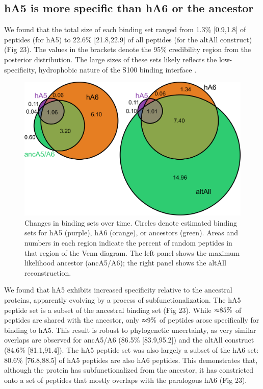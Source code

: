 \subsection{hA5 is more specific than hA6 or the ancestor}

We found that the total size of each binding set ranged from 1.3\%
{[}0.9,1.8{]} of peptides (for hA5) to 22.6\% {[}21.8,22.9{]} of all
peptides (for the altAll construct) (Fig 23). The values in the brackets
denote the 95\% credibility region from the posterior distribution.
The large sizes of these sets likely reflects the low-specificity,
hydrophobic nature of the S100 binding interface \citep{wheeler_conservation_2017}. 

\begin{figure}%
\centering
	\includegraphics{ch6-fig5.png} 
\caption[Changes in binding sets over time]{Changes in binding sets over time. Circles denote
estimated binding sets for hA5 (purple), hA6 (orange), or ancestors
(green). Areas and numbers in each region indicate the percent of
random peptides in that region of the Venn diagram. The left panel
shows the maximum likelihood ancestor (ancA5/A6); the right panel
shows the altAll reconstruction.\label{samplefigure}}	
\end{figure}

We found that hA5 exhibits increased specificity relative to the ancestral
proteins, apparently evolving by a process of subfunctionalization.
The hA5 peptide set is a subset of the ancestral binding set (Fig
23). While $\text{\ensuremath{\approx}}85\%$ of peptides are shared
with the ancestor, only $\text{\ensuremath{\approx}}9\%$ of peptides
arose specifically for binding to hA5. This result is robust to phylogenetic
uncertainty, as very similar overlaps are observed for ancA5/A6 (86.5\%
{[}83.9,95.2{]}) and the altAll construct (84.6\% {[}81.1,91.4{]}).
The hA5 peptide set was also largely a subset of the hA6 set: 80.6\%
{[}76.8,88.5{]} of hA5 peptides are also hA6 peptides. This demonstrates
that, although the protein has subfunctionalized from the ancestor,
it has constricted onto a set of peptides that mostly overlaps with
the paralogous hA6 (Fig 23). 

